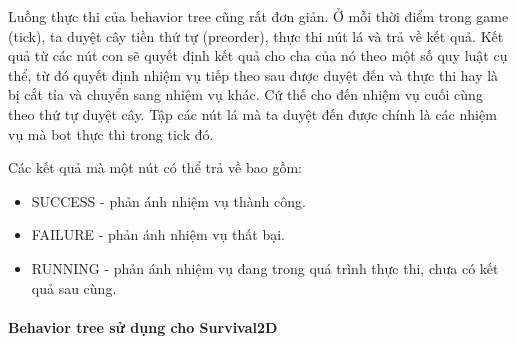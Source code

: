\documentclass[12pt,a4paper]{article}
\begin{document}
  Luồng thực thi của behavior tree cũng rất đơn giản. Ở mỗi thời điểm trong game (tick), ta duyệt cây tiền thứ tự (preorder), thực thi nút lá và trả về kết quả. Kết quả từ các nút con sẽ quyết định kết quả cho cha của nó theo một số quy luật cụ thể, từ đó quyết định nhiệm vụ tiếp theo sau được duyệt đến và thực thi hay là bị cắt tỉa và chuyển sang nhiệm vụ khác. Cứ thế cho đến nhiệm vụ cuối cùng theo thứ tự duyệt cây. Tập các nút lá mà ta duyệt đến được chính là các nhiệm vụ mà bot thực thi trong tick đó.

  Các kết quả mà một nút có thể trả về bao gồm:
  \begin{itemize}
      \item SUCCESS - phản ánh nhiệm vụ thành công.
      \item FAILURE - phản ánh nhiệm vụ thất bại.
      \item RUNNING - phản ánh nhiệm vụ đang trong quá trình thực thi, chưa có kết quả sau cùng.
  \end{itemize}
  \par{}

  \paragraph{Behavior tree sử dụng cho \textbf{Survival2D}}\mbox{}
\end{document}
